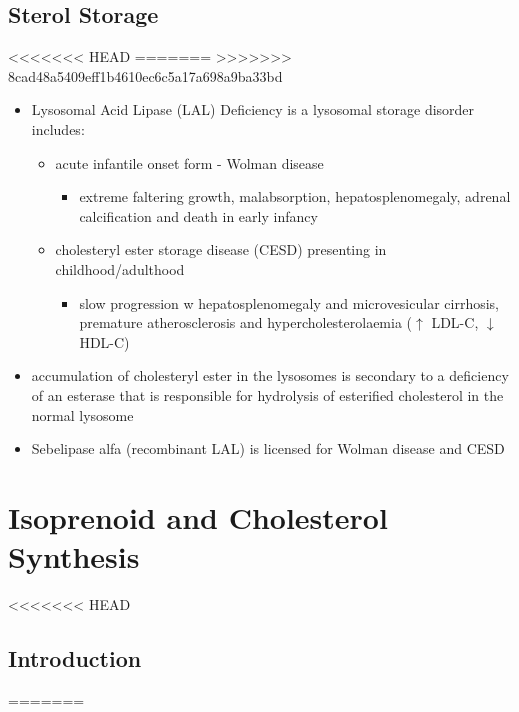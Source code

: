 \documentclass{scrartcl}
\begin{document}
\begin{itemize}
\subsection{Sterol Storage}
<<<<<<< HEAD
\label{sec:org1211bbc}
=======
\label{sec:orgebb8752}
>>>>>>> 8cad48a5409eff1b4610ec6c5a17a698a9ba33bd
\begin{itemize}
\item Lysosomal Acid Lipase (LAL) Deficiency is a lysosomal storage
disorder includes:
\begin{itemize}
\item acute infantile onset form - Wolman disease
\begin{itemize}
\item extreme faltering growth, malabsorption, hepatosplenomegaly,
adrenal calcification and death in early infancy
\end{itemize}
\item cholesteryl ester storage disease (CESD) presenting in childhood/adulthood
\begin{itemize}
\item slow progression w hepatosplenomegaly and microvesicular
cirrhosis, premature atherosclerosis and hypercholesterolaemia
(\(\uparrow\) LDL-C, \(\downarrow\) HDL-C)
\end{itemize}
\end{itemize}
\item accumulation of cholesteryl ester in the lysosomes is secondary to a
deficiency of an esterase that is responsible for hydrolysis of
esterified cholesterol in the normal lysosome
\item Sebelipase alfa (recombinant LAL) is licensed for Wolman disease and
CESD
\end{itemize}
\section{Isoprenoid and Cholesterol Synthesis}
<<<<<<< HEAD
\label{sec:org9ca8b0a}
\subsection{Introduction}
\label{sec:orgcb44af3}
=======
\label{sec:org61a023a}

\end{itemize}
\end{document}
